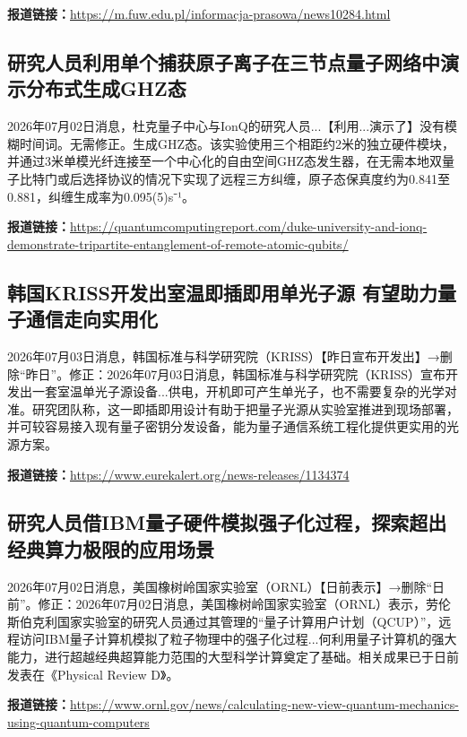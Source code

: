 \documentclass[12pt,a4paper]{ctexart}
\begin{document}
\noindent\textbf{报道链接：}\url{https://m.fuw.edu.pl/informacja-prasowa/news10284.html}

\subsection{ 研究人员利用单个捕获原子离子在三节点量子网络中演示分布式生成GHZ态 }

2026年07月02日消息，杜克量子中心与IonQ的研究人员...【利用...演示了】没有模糊时间词。无需修正。生成GHZ态。该实验使用三个相距约2米的独立硬件模块，并通过3米单模光纤连接至一个中心化的自由空间GHZ态发生器，在无需本地双量子比特门或后选择协议的情况下实现了远程三方纠缠，原子态保真度约为0.841至0.881，纠缠生成率为0.095(5)s⁻¹。

\noindent\textbf{报道链接：}\url{https://quantumcomputingreport.com/duke-university-and-ionq-demonstrate-tripartite-entanglement-of-remote-atomic-qubits/}

\subsection{ 韩国KRISS开发出室温即插即用单光子源 有望助力量子通信走向实用化 }

2026年07月03日消息，韩国标准与科学研究院（KRISS）【昨日宣布开发出】→删除“昨日”。修正：2026年07月03日消息，韩国标准与科学研究院（KRISS）宣布开发出一套室温单光子源设备...供电，开机即可产生单光子，也不需要复杂的光学对准。研究团队称，这一即插即用设计有助于把量子光源从实验室推进到现场部署，并可较容易接入现有量子密钥分发设备，能为量子通信系统工程化提供更实用的光源方案。

\noindent\textbf{报道链接：}\url{https://www.eurekalert.org/news-releases/1134374}

\subsection{ 研究人员借IBM量子硬件模拟强子化过程，探索超出经典算力极限的应用场景 }

2026年07月02日消息，美国橡树岭国家实验室（ORNL）【日前表示】→删除“日前”。修正：2026年07月02日消息，美国橡树岭国家实验室（ORNL）表示，劳伦斯伯克利国家实验室的研究人员通过其管理的“量子计算用户计划（QCUP）”，远程访问IBM量子计算机模拟了粒子物理中的强子化过程...何利用量子计算机的强大能力，进行超越经典超算能力范围的大型科学计算奠定了基础。相关成果已于日前发表在《Physical Review D》。

\noindent\textbf{报道链接：}\url{https://www.ornl.gov/news/calculating-new-view-quantum-mechanics-using-quantum-computers}
\end{document}
